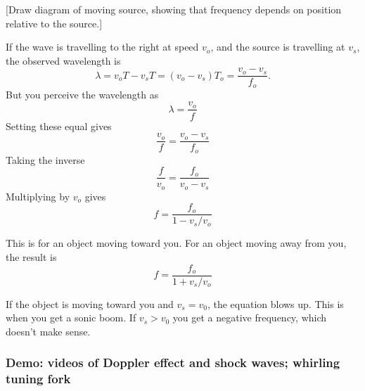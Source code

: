 \vspace{5cm}


[Draw diagram of moving source, showing that frequency depends on position relative to the source.]
\vspace{5cm}

If the wave is travelling to the right at speed $v_o$, and the source is travelling at $v_s$, the observed wavelength is 
$$\lambda=v_oT-v_sT=(v_o-v_s)T_o=\frac{v_o-v_s}{f_o}.$$
But you perceive the wavelength as 
$$\lambda=\frac{v_o}{f}$$
Setting these equal gives
$$\frac{v_o}{f}=\frac{v_o-v_s}{f_o}$$
Taking the inverse
$$\frac{f}{v_o}=\frac{f_o}{v_o-v_s}$$
Multiplying by $v_o$ gives
$$\boxed{f=\frac{f_o}{1-v_s/v_o}}$$

This is for an object moving toward you. For an object moving away from you, the result is
$$\boxed{f=\frac{f_o}{1+v_s/v_o}}$$

If the object is moving toward you and $v_s=v_0$, the equation blows up. This is when you get a sonic boom. If $v_s>v_0$ you get a negative frequency, which doesn't make sense.

\subsubsection{Demo: videos of Doppler effect and shock waves; whirling tuning fork}


\clearpage
